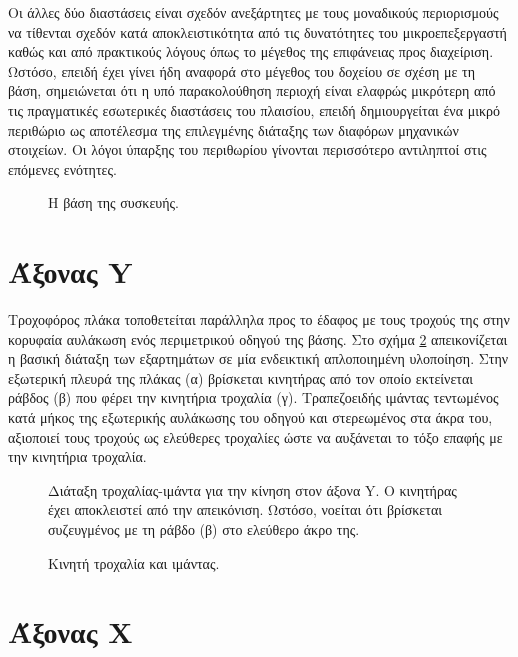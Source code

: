 Οι άλλες δύο διαστάσεις είναι σχεδόν ανεξάρτητες με τους μοναδικούς περιορισμούς
να τίθενται σχεδόν κατά αποκλειστικότητα από τις δυνατότητες του
μικροεπεξεργαστή καθώς και από πρακτικούς λόγους όπως το μέγεθος της επιφάνειας
προς διαχείριση.
Ωστόσο, επειδή έχει γίνει ήδη αναφορά στο μέγεθος του δοχείου σε σχέση με τη
βάση, σημειώνεται ότι η υπό παρακολούθηση περιοχή είναι ελαφρώς μικρότερη από
τις πραγματικές εσωτερικές διαστάσεις του πλαισίου, επειδή δημιουργείται ένα
μικρό περιθώριο ως αποτέλεσμα της επιλεγμένης διάταξης των διαφόρων μηχανικών
στοιχείων.
Οι λόγοι ύπαρξης του περιθωρίου γίνονται περισσότερο αντιληπτοί στις επόμενες
ενότητες.

\begin{figure}
    \caption{Η βάση της συσκευής. \label{fig:construct:base}}
    \begin{center}%
    \def\svgwidth{\textwidth}
    
    \end{center}
\end{figure}

\section{Άξονας Y}

Τροχοφόρος πλάκα τοποθετείται παράλληλα προς το έδαφος με τους τροχούς της στην
κορυφαία αυλάκωση ενός περιμετρικού οδηγού της βάσης. Στο σχήμα
\ref{fig:construct:belt-pulley-y} απεικονίζεται η βασική διάταξη των εξαρτημάτων
σε μία ενδεικτική απλοποιημένη υλοποίηση.
Στην εξωτερική πλευρά της πλάκας (α) βρίσκεται κινητήρας από τον οποίο
εκτείνεται ράβδος (β) που φέρει την κινητήρια τροχαλία (γ).
Τραπεζοειδής ιμάντας τεντωμένος κατά μήκος της εξωτερικής αυλάκωσης του οδηγού
και στερεωμένος στα άκρα του, αξιοποιεί τους τροχούς ως ελεύθερες τροχαλίες ώστε
να αυξάνεται το τόξο επαφής με την κινητήρια τροχαλία.

\begin{figure}
    \caption{Κινητή τροχαλία και ιμάντας. \label{fig:construct:belt-pulley-y}}
Διάταξη τροχαλίας-ιμάντα για την κίνηση στον άξονα Y. Ο κινητήρας έχει
αποκλειστεί από την απεικόνιση. Ωστόσο, νοείται ότι βρίσκεται συζευγμένος με τη
ράβδο (β) στο ελεύθερο άκρο της.
    \begin{center}%
    \def\svgwidth{0.7\textwidth}
    
    \end{center}
\end{figure}

\section{Άξονας X}


